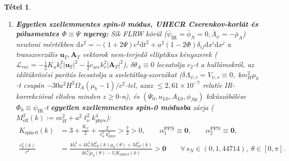 \documentclass[11pt,a4paper]{article}
\newtheorem{theorem}{Tétel}
\begin{document}
\begin{theorem}
\begin{enumerate}
  \item \textbf{Egyetlen szellemmentes spin-0 módus, UHECR Cserenkov-korlát és pólusmentes $\Phi \equiv \Psi$ nyereg:} Sík FLRW körül ($\bar{\psi}_{\mathrm{IR}} = \bar{\phi}_N = 0, \bar{\Lambda}_\psi = -\bar{\rho}_A$) newtoni mértékben $\mathrm{d}s^2 = -(1 + 2\Psi)c^2\mathrm{d}t^2 + a^2(1 - 2\Phi)\delta_{ij}\mathrm{d}x^i\mathrm{d}x^j$ a transzverzális $\mathbf{u}_T, \mathbf{A}_T$ vektorok nem-terjedő elliptikus kényszerek ($\mathcal{L}_{\mathrm{vec}} = -\frac{1}{2}K_u k_c^2|\mathbf{u}_T|^2 - \frac{1}{2}c_{\mathrm{acc}}k_c^2|\mathbf{A}_T|^2$), $\delta\theta_A \equiv 0$ lecsatolja $c_2$-t a hullámokról, az időtükrözési paritás lecsatolja a szeletátlag-szorzókat ($\delta\Lambda_{\psi,c} = V_{\psi,s} \equiv 0$, $4m_H^2\mu_b$-t csupán $-30a^2 H^2\Omega_A(\mu_b-1)/c^2$-tel, azaz $\le 2{,}61\times 10^{-7}$ relatív IR-korrekcióval eltolva minden $z \ge 0$-n), és $(\Psi_0, u_{L0}, A_{L0}, \phi_{N0})$ kiküszöbölése $\Phi_0 \equiv \psi_{\mathrm{IR}}$-t \textbf{egyetlen szellemmentes spin-0 módusba} zárja ($M_{\mathrm{eff}}^2(k) := m_H^2 + a^2\ell_\nu^2 k_{\mathrm{phys}}^4$):
  \begin{equation}
  \begin{aligned}
    K_{\mathrm{spin\text{-}0}}(k) &= 3 + \frac{K_\psi}{2} + \frac{2}{\ell_u^2 k_{\mathrm{phys}}^2} > \frac{7}{2} > 0, \qquad \alpha_1^{\mathrm{PPN}} \equiv \mathbf{0}, \qquad \alpha_2^{\mathrm{PPN}} \equiv \mathbf{0}, \\
    \frac{c_S^2(k)}{c^2} &= \frac{4k_c^4 + 4k_c^2 M_{\mathrm{eff}}^2(k)\mu_b(\theta) + M_{\mathrm{eff}}^4(k)}{4k_c^4\bigl[\mu_b(\theta) - 1\bigr]K_{\mathrm{spin\text{-}0}}(k)} > \mathbf{0} \qquad \forall\,s_N \in (0, 1{,}44714),\; \theta \in [0,\pi].
  \end{aligned}
  \label{eq:luminal-ppn}
  \end{equation}

\end{enumerate}
\end{theorem}
\end{document}
